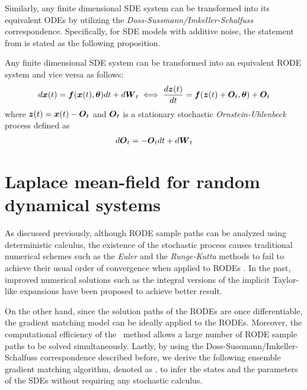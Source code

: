 Similarly, any finite dimensional SDE system can be transformed into its equivalent ODEs by utilizing the \emph{Doss-Sussmann/Imkeller-Schalfuss} \citep{sussmann1978gap, imkeller2001conjugacy} correspondence.
Specifically, for SDE models with additive noise, the statement from \cite[]{jentzen2011taylor} is stated as the following proposition.
\begin{proposition}
    Any finite dimensional SDE system can be transformed into an equivalent RODE system and vice versa as follows:
    \begin{align}
        d\boldsymbol{x}(t) = \boldsymbol{f}(\boldsymbol{x}(t), \boldsymbol{\theta})dt + d\boldsymbol{W}_t 
        \iff 
        \frac{d\boldsymbol{z}(t)}{dt} = \boldsymbol{f}(\boldsymbol{z}(t) + \boldsymbol{O}_t, \boldsymbol{\theta}) + \boldsymbol{O}_t
        \label{eq-rode-sde}
    \end{align}
    where $\boldsymbol{z}(t) = \boldsymbol{x}(t) - \boldsymbol{O}_t$ and $\boldsymbol{O}_t$ is a stationary stochastic \emph{Ornstein-Uhlenbeck} process defined as
    \begin{align}
        d\boldsymbol{O}_t = -\boldsymbol{O}_tdt + d\boldsymbol{W}_t
    \end{align}
\end{proposition}  

\section{Laplace mean-field for random dynamical systems}
\label{sec-rodes-laplace}

As discussed previously, although RODE sample paths can be analyzed using deterministic calculus, the existence of the stochastic process causes traditional numerical schemes such as the \emph{Euler} and the \emph{Runge-Kutta} methods \citep{butcher2016numerical} to fail to achieve their usual order of convergence when applied to RODEs \citep{grune2001pathwise}.
In the past, improved numerical solutions such as the integral versions of the implicit Taylor-like expansions \citep{kloeden2007pathwise} have been proposed to achieve better result.

On the other hand, since the solution paths of the RODEs are once differentiable, the gradient matching model can be ideally applied to the RODEs.
Moreover, the computational efficiency of the \algolpmf\ method allows a large number of RODE sample paths to be solved simultaneously. 
Lastly, by using the Doss-Sussmann/Imkeller-Schalfuss correspondence described before, we derive the following ensemble gradient matching algorithm, denoted as \algolpmfsde, to infer the states and the parameters of the SDEs without requiring any stochastic calculus.

